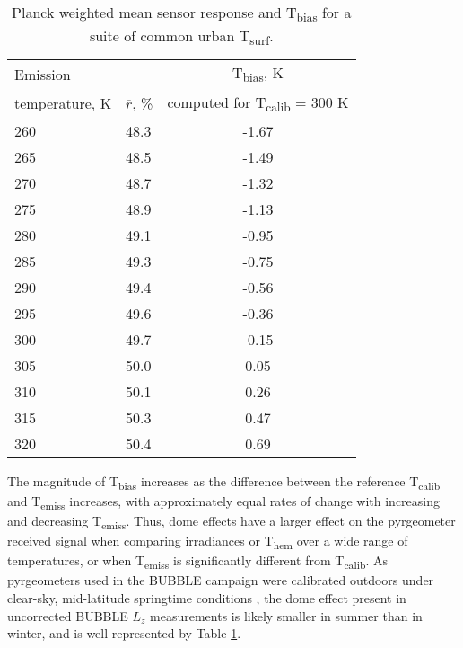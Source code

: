 \begin{table}[H]
	\centering
	\caption{Planck weighted mean sensor response and T\textsubscript{bias} for a suite of common urban T\textsubscript{surf}.}
	\label{nonuniformsen}
	\begin{tabular}{lp{2cm}c}
		\toprule 
		Emission & & T\textsubscript{bias}, \si{\kelvin} \\
		temperature, \si{\kelvin}& $\overline{r}$, \% & computed for T\textsubscript{calib} = 300 \si{\kelvin} \\ \midrule
		260 & 48.3 & -1.67 \\ 
		265 & 48.5 & -1.49 \\ 
		270 & 48.7 & -1.32 \\ 
		275 & 48.9 & -1.13 \\ 
		280 & 49.1 & -0.95 \\ 
		285 & 49.3 & -0.75 \\ 
		290 & 49.4 & -0.56 \\ 
		295 & 49.6 & -0.36 \\ 
		300 & 49.7 & -0.15 \\ 
		305 & 50.0 & 0.05 \\ 
		310 & 50.1 & 0.26  \\ 
		315 & 50.3 & 0.47 \\ 
		320 & 50.4 & 0.69  \\
		\bottomrule
	\end{tabular} 
\end{table}

The magnitude of T\textsubscript{bias} increases as the difference between the reference T\textsubscript{calib} and T\textsubscript{emiss} increases, with approximately equal rates of change with increasing and decreasing T\textsubscript{emiss}. Thus, dome effects have a larger effect on the pyrgeometer received signal when comparing irradiances or T\textsubscript{hem} over a wide range of temperatures, or when T\textsubscript{emiss} is significantly different from T\textsubscript{calib}. As pyrgeometers used in the BUBBLE campaign were calibrated outdoors under clear-sky, mid-latitude springtime conditions \cite{Christen2005}, the dome effect present in uncorrected BUBBLE $L_z$ measurements is likely smaller in summer than in winter, and is well represented by Table \ref{nonuniformsen}.

